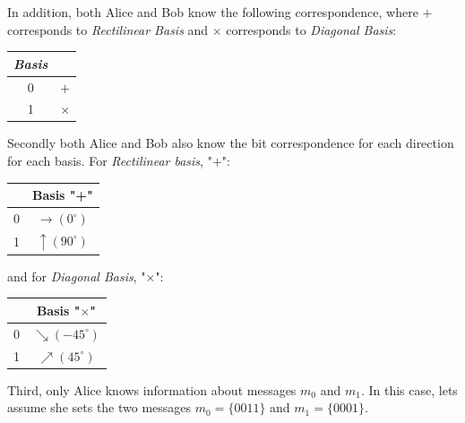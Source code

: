  In addition, both Alice and Bob know the following correspondence, where $+$ corresponds to \textit{Rectilinear Basis} and $\times$ corresponds to \textit{Diagonal Basis}:

\begin{table}[H]
\centering
\begin{tabular}{c|c}
\textbf{\textit{Basis}}         &  \\ \hline
 0 & $+$ \\
 1 & $\times$ \\
\end{tabular}
\end{table}

Secondly both Alice and Bob also know the bit correspondence for each direction for each basis. For \textit{Rectilinear basis}, "$+$":

\begin{table}[H]
\centering
\begin{tabular}{c|c}
            & Basis "+" \\ \hline
 0 & $\to (0^{\circ})$ \\
 1 & $\uparrow (90^{\circ})$ \\
\end{tabular}
\end{table}

and for \textit{Diagonal Basis}, "$\times$":

\begin{table}[H]
\centering
\begin{tabular}{c|c}
      & Basis "$\times$" \\ \hline
 0 & $\searrow (-45^{\circ})$ \\
 1 & $\nearrow (45^{\circ})$ \\
\end{tabular}
\end{table}

Third, only Alice knows information about messages $m_{0}$ and $m_{1}$.
In this case, lets assume she sets the two messages $m_{0} = \{0 0 1 1\}$ and $m_{1} = \{0 0 0 1\}$.

